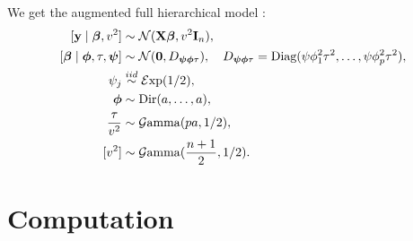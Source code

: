 \documentclass[ba]{imsart}
\begin{document}
We get the augmented full hierarchical model :
\begin{align} \label{sq_dl_h}
[ \y \mid \bbeta, v^2 ] & \sim \NormRV(\X \bbeta, v^2 \I_n), \\
[\bbeta \mid \bphi, \tau , \bpsi ] & \sim \NormRV(\0, D_{\bpsi \bphi \tau}), \quad D_{\bpsi \bphi \tau} = \text{Diag}(\psi\phi_1^2\tau^2, \ldots, \psi\phi_p^2\tau^2), \\
\psi_j & \stackrel{iid}{\sim} \mathcal{E}\mathrm{xp}(1/2), \\
\bphi & \sim \text{\rm{Dir}}(a, \ldots ,a), \\
\frac{\tau}{v^2} & \sim \mathcal{G}\mathrm{amma}(pa , 1/2), \\
[v^2] & \sim \mathcal{G}\mathrm{amma}(\frac{n+1}{2} , 1/2).  
\end{align}



\section{Computation}\label{sec:comp}
\end{document}
